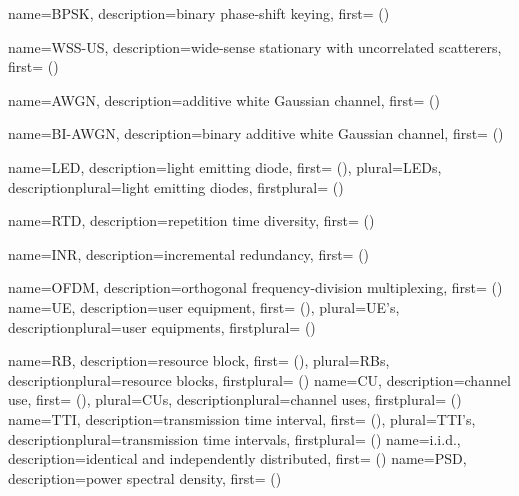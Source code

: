 {
  name={BPSK},
  description={binary phase-shift keying},
  first={ ()}
}

{
  name={WSS-US},
  description={wide-sense stationary with uncorrelated scatterers},
  first={ ()}
}


{
  name={AWGN},
  description={additive white Gaussian channel},
  first={ ()}
}

{
  name={BI-AWGN},
  description={binary additive white Gaussian channel},
  first={ ()}
}





{
  name={LED},
  description={light emitting diode},
  first={ ()},
  plural={LEDs},
  descriptionplural={light emitting diodes},
  firstplural={ ()}
}

{
  name={RTD},
  description={repetition time diversity},
  first={ ()}
}

{
  name={INR},
  description={incremental redundancy},
  first={ ()}
}


{
  name={OFDM},
  description={orthogonal frequency-division multiplexing},
  first={ ()}
}
{
  name={UE},
  description={user equipment},
  first={ ()},
  plural={UE's},
  descriptionplural={user equipments},
  firstplural={ ()}
}

{
  name={RB},
  description={resource block},
  first={ ()},
  plural={RBs},
  descriptionplural={resource blocks},
  firstplural={ ()}
}
{
  name={CU},
  description={channel use},
  first={ ()},
  plural={CUs},
  descriptionplural={channel uses},
  firstplural={ ()}
}
{
  name={TTI},
  description={transmission time interval},
  first={ ()},
  plural={TTI's},
  descriptionplural={transmission time intervals},
  firstplural={ ()}
}
{
  name={i.i.d.},
  description={identical and independently distributed},
  first={ ()}
}
{
  name={PSD},
  description={power spectral density},
  first={ ()}
}



